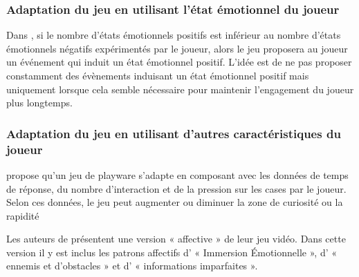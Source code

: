 \documentclass{article}
\begin{document}
        \subsubsection{Adaptation du jeu en utilisant l'état émotionnel du joueur}
            Dans \cite{Mostefai_et_al._2019}, si le nombre d’états émotionnels positifs est inférieur au nombre d’états émotionnels négatifs expérimentés par le joueur, alors le jeu proposera au joueur un événement qui induit un état émotionnel positif. 
            L’idée est de ne pas proposer constamment des évènements induisant un état émotionnel positif mais uniquement lorsque cela semble nécessaire pour maintenir l’engagement du joueur plus longtemps.
        \subsubsection{Adaptation du jeu en utilisant d'autres caractéristiques du joueur}
           \cite{yannakakis_et_al._2009} propose qu’un jeu de playware s’adapte en composant avec les données de temps de réponse, du nombre d’interaction et de la pression sur les cases par le joueur. Selon ces données, le jeu peut augmenter ou diminuer la zone de curiosité ou la rapidité\par
            Les auteurs de \cite{nalepa_et_al._2017} présentent une version « affective » de leur jeu vidéo. Dans cette version il y est inclus les patrons affectifs d’ « Immersion Émotionnelle », d’ « ennemis et d’obstacles » et d’ « informations imparfaites ».\par
\end{document}
